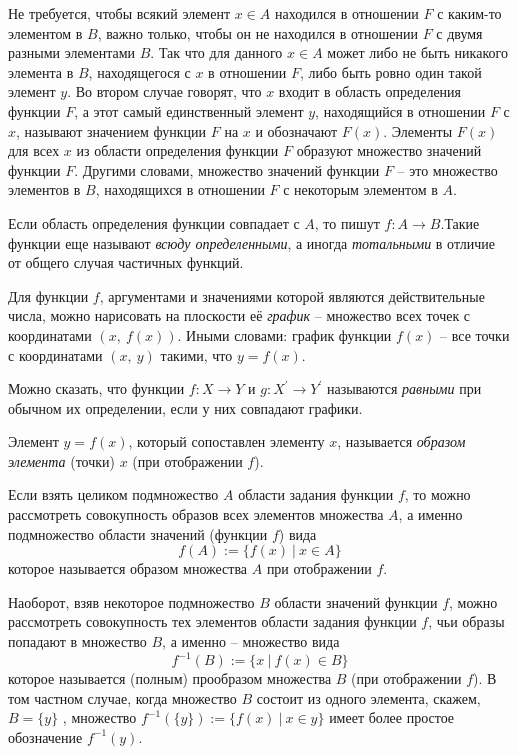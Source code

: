 \documentclass[a4paper, 12pt]{article}
\begin{document}
\par Не требуется, чтобы всякий элемент $x \in A$ находился в отношении $F$ с каким-то элементом в $B$, важно только, чтобы он не находился в отношении $F$ с двумя разными элементами $B$. Так что для данного $x \in A$ может либо не быть никакого элемента в $B$, находящегося с $x$ в отношении $F$, либо быть ровно один такой элемент $y$. Во втором случае говорят, что $x$ входит в область определения функции $F$, а этот самый единственный элемент $y$, находящийся в отношении $F$ с $x$, называют значением функции $F$ на $x$ и обозначают $F(x)$. Элементы $F(x)$ для всех $x$ из области определения функции $F$ образуют множество значений функции $F$. Другими словами, множество значений функции $F$ -- это множество элементов в $B$, находящихся в отношении $F$ с некоторым элементом в $A$.

\par Если область определения функции совпадает с $A$, то пишут $f : A \to B$.Такие функции еще называют \textit{всюду определенными}, а иногда \textit{тотальными} в отличие от общего случая частичных функций.

\par Для функции $f$, аргументами и значениями которой являются действительные числа, можно нарисовать на плоскости её \textit{график} -- множество всех точек с координатами $(x,\ f(x))$. Иными словами: график функции $f(x)$ -- все точки с координатами $(x,\ y)$ такими, что $y = f(x)$.

\par Можно сказать, что функции $f: X \to Y$  и $g: X^{'} \to Y^{'}$  называются \textit{равными} при обычном их определении, если у них совпадают графики.

\par Элемент $y = f(x)$, который сопоставлен элементу $x$, называется \textit{образом элемента} (точки) $x$ (при отображении $f$).

\par Если взять целиком подмножество $A$ области задания функции $f$, то можно рассмотреть совокупность образов всех элементов множества  $A$, а именно подмножество области значений (функции $f$) вида
\begin{equation}
f(A) := \{f(x)\ |\ x \in A\} 
\end{equation}
которое называется образом множества $A$ при отображении $f$. 

\par Наоборот, взяв некоторое подмножество $B$ области значений функции $f$, можно рассмотреть совокупность тех элементов области задания функции $f$, чьи образы попадают в множество $B$, а именно -- множество вида
\begin{equation}
f^{-1}(B) := \{x\ |\ f(x) \in B\} 
\end{equation}
которое называется (полным) прообразом множества $B$ (при отображении $f$).
В том частном случае, когда множество $B$ состоит из одного элемента, скажем, $B = \{y\}$ , множество $f^{-1}(\{y\}) := \{f(x)\ |\ x \in y\}$ имеет более простое обозначение $f^{-1}(y)$.
\end{document}
